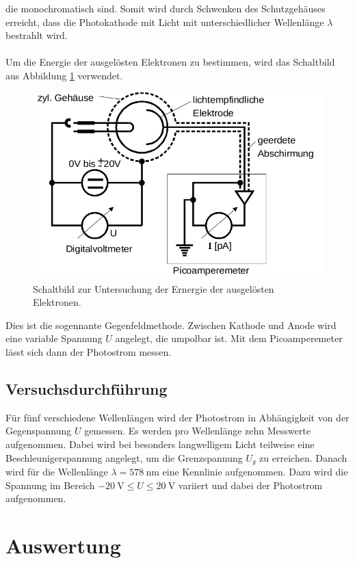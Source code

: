 die monochromatisch sind. Somit wird durch Schwenken des Schutzgehäuses erreicht, dass die Photokathode
mit Licht mit unterschiedlicher Wellenlänge $\lambda$ bestrahlt wird. \\
\\
Um die Energie der ausgelösten Elektronen zu bestimmen, wird das Schaltbild aus Abbildung \ref{fig:4}
verwendet.
\begin{figure}[h]
  \centering
  \includegraphics[scale=0.4]{schaltbild.png}
  \caption{Schaltbild zur Untersuchung der Ernergie der ausgelösten Elektronen. \cite{anleitung}}
  \label{fig:4}
\end{figure}
Dies ist die sogennante Gegenfeldmethode. Zwischen Kathode und Anode wird eine variable
Spannung $U$ angelegt, die umpolbar ist. Mit dem Picoamperemeter lässt sich dann der
Photostrom messen.
\subsection{Versuchsdurchführung}
Für fünf verschiedene Wellenlängen wird der Photostrom in Abhängigkeit von der Gegenspannung
$U$ gemessen. Es werden pro Wellenlänge zehn Messwerte aufgenommen. Dabei wird bei besonders
langwelligem Licht teilweise eine Beschleunigerspannung angelegt, um die Grenzspannung
$U_g$ zu erreichen. Danach wird für die Wellenlänge
$\lambda = \SI{578}{\nano\meter}$ eine Kennlinie aufgenommen. Dazu wird die Spannung
im Bereich $\SI{-20}{\volt} \leq U \leq \SI{20}{\volt}$ variiert und dabei der Photostrom
aufgenommen.

\section{Auswertung}
